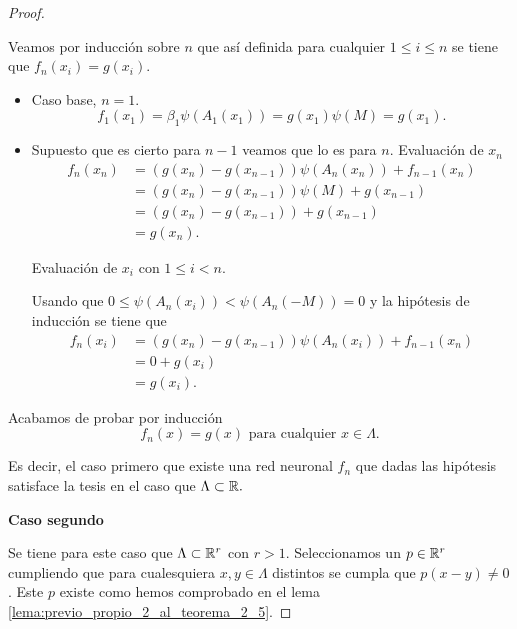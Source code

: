 \begin{proof}
\begin{itemize}
\end{itemize}
Veamos por inducción sobre $n$ que así definida para cualquier $1 \leq i \leq n$ se tiene que     
$f_n(x_i) = g(x_i)$. 


\begin{itemize}
    \item Caso base, $n=1$. 
    \begin{equation}
        f_1(x_1)= \beta_1 \psi(A_1(x_1)) = g(x_1)\psi(M) = g(x_1).
    \end{equation}
    \item Supuesto que es cierto para $n-1$ veamos que lo es para $n$.      
    Evaluación de $x_n$
    \begin{align}
        f_n(x_n) 
        &= 
        (g(x_n) - g(x_{n-1}))\psi(A_n(x_n)) + f_{n-1}(x_n)
        \\
        & = (g(x_n) - g(x_{n-1}))\psi(M) + g(x_{n-1}) 
        \\
        & = (g(x_n) - g(x_{n-1})) + g(x_{n-1}) 
        \\
        & = g(x_n).
    \end{align}

Evaluación de $x_i$ con $1 \leq i < n$. 

Usando que $0 \leq \psi(A_n(x_i)) < \psi(A_n(-M)) = 0$ y la hipótesis de inducción se tiene que 
\begin{align}
    f_n(x_i) 
        &= 
        (g(x_n) - g(x_{n-1}))\psi(A_n(x_i)) + f_{n-1}(x_n)
        \\
        & = 0 + g(x_{i}) 
        \\
        &= g(x_i).
\end{align}
\end{itemize}

Acabamos de probar por inducción 
\begin{equation}
    f_n(x) = g(x) \text{ para cualquier } x \in \Lambda. 
\end{equation}

Es decir, el caso primero que existe una red neuronal $f_n$ que dadas las hipótesis satisface la tesis en el caso que $\Lambda \subset \mathbb{R}.$

\textbf{Caso segundo}  

Se tiene para este caso que $\Lambda \subset \mathbb{R}^r$ con $r >1$. 
Seleccionamos un $p \in \mathbb{R}^r$ cumpliendo que 
para cualesquiera $x,y \in \Lambda$ distintos 
se cumpla que $p(x-y) \neq 0$. Este $p$ existe como hemos comprobado en el lema \ref{lema:previo_propio_2_al_teorema_2_5}.


\end{proof}

